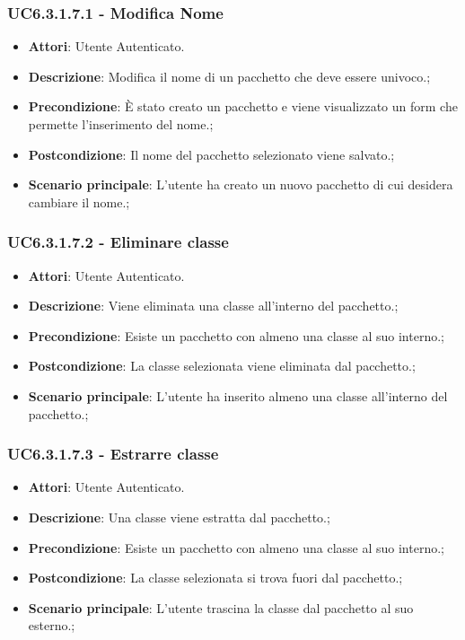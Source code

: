 \subsubsection{UC6.3.1.7.1 - Modifica Nome} 
\label{sssec:UC6.3.1.7.1} 
\begin{itemize} 
\item \textbf{Attori}: Utente Autenticato.
\item \textbf{Descrizione}: Modifica il nome di un pacchetto che deve essere univoco.;
\item \textbf{Precondizione}: È stato creato un pacchetto e viene visualizzato un form che permette l'inserimento del nome.;
\item \textbf{Postcondizione}: Il nome del pacchetto selezionato viene salvato.;
\item \textbf{Scenario principale}: L'utente ha creato un nuovo pacchetto di cui desidera cambiare il nome.;\end{itemize} 
\subsubsection{UC6.3.1.7.2 - Eliminare classe} 
\label{sssec:UC6.3.1.7.2} 
\begin{itemize} 
\item \textbf{Attori}: Utente Autenticato.
\item \textbf{Descrizione}: Viene eliminata una classe all'interno del pacchetto.;
\item \textbf{Precondizione}: Esiste un pacchetto con almeno una classe al suo interno.;
\item \textbf{Postcondizione}: La classe selezionata viene eliminata dal pacchetto.;
\item \textbf{Scenario principale}: L'utente ha inserito almeno una classe all'interno del pacchetto.;\end{itemize} 
\subsubsection{UC6.3.1.7.3 - Estrarre classe} 
\label{sssec:UC6.3.1.7.3} 
\begin{itemize} 
\item \textbf{Attori}: Utente Autenticato.
\item \textbf{Descrizione}: Una classe viene estratta dal pacchetto.;
\item \textbf{Precondizione}: Esiste un pacchetto con almeno una classe al suo interno.;
\item \textbf{Postcondizione}: La classe selezionata si trova fuori dal pacchetto.;
\item \textbf{Scenario principale}: L'utente trascina la classe dal pacchetto al suo esterno.;\end{itemize} 
